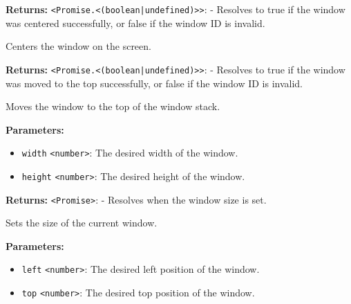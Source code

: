 \documentclass[12pt,a4paper]{article}
\begin{document}
\noindent \textbf{Returns:} \texttt{<Promise.<(boolean|undefined)>>}: - Resolves to \textasciigrave{}true\textasciigrave{} if the window was centered successfully, or \textasciigrave{}false\textasciigrave{} if the window ID is invalid.

\noindent Centers the window on the screen.

\vspace{5mm}
\noindent {}


\noindent \textbf{Returns:} \texttt{<Promise.<(boolean|undefined)>>}: - Resolves to \textasciigrave{}true\textasciigrave{} if the window was moved to the top successfully, or \textasciigrave{}false\textasciigrave{} if the window ID is invalid.

\noindent Moves the window to the top of the window stack.

\vspace{5mm}
\noindent {}


\noindent \textbf{Parameters:}
\begin{itemize}
  \item \texttt{width} \texttt{<number>}: The desired width of the window.
  \item \texttt{height} \texttt{<number>}: The desired height of the window.
\end{itemize}

\noindent \textbf{Returns:} \texttt{<Promise>}: - Resolves when the window size is set.

\noindent Sets the size of the current window.

\vspace{5mm}
\noindent {}


\noindent \textbf{Parameters:}
\begin{itemize}
  \item \texttt{left} \texttt{<number>}: The desired left position of the window.
  \item \texttt{top} \texttt{<number>}: The desired top position of the window.
\end{itemize}
\end{document}
